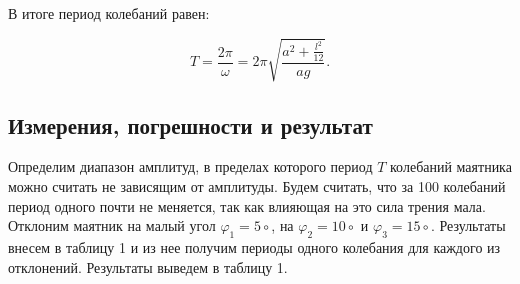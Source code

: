 \documentclass[a4paper,12pt]{report}
\begin{document}
В итоге период колебаний равен:

\begin{equation}
	T = \frac{2\pi}{\omega}=2\pi\sqrt{\frac{a^2+\frac{l^2}{12}}{ag}}.
	\label{form4}
\end{equation}

\subsection*{Измерения, погрешности и результат}

Определим диапазон амплитуд, в пределах которого период $T$ колебаний маятника можно считать не зависящим от амплитуды. Будем считать, что за 100 колебаний период одного почти не меняется, так как влияющая на это сила трения мала. Отклоним маятник на малый угол $\varphi_1 = 5{\circ}$, на $\varphi_2 = 10{\circ}$ и $\varphi_3 = 15{\circ}$. Результаты внесем в таблицу 1 и из нее получим периоды одного колебания для каждого из отклонений. Результаты выведем в таблицу 1.


\begin{table}[h!]
\centering
{}
\caption{\textit{Измерение зависимости периода одного колебания от угла отклонения.}}
\end{table}
\end{document}
